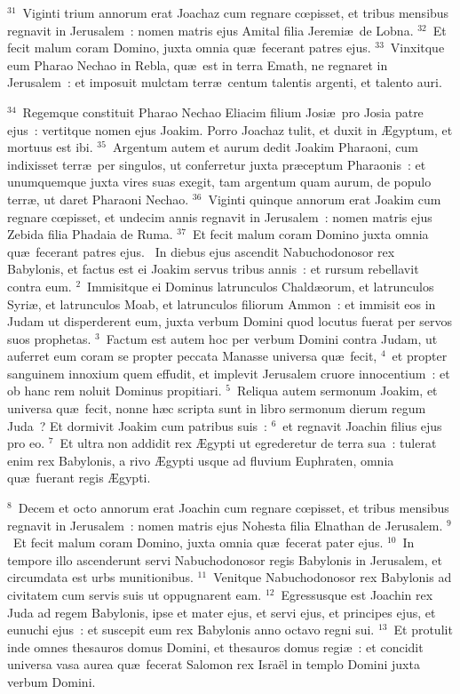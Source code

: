 ${}^{31}$~Viginti trium annorum erat Joachaz cum regnare cœpisset, et tribus mensibus regnavit in Jerusalem~: nomen matris ejus Amital filia Jeremi\ae\ de Lobna.
${}^{32}$~Et fecit malum coram Domino, juxta omnia qu\ae\ fecerant patres ejus.
${}^{33}$~Vinxitque eum Pharao Nechao in Rebla, qu\ae\ est in terra Emath, ne regnaret in Jerusalem~: et imposuit mulctam terr\ae\ centum talentis argenti, et talento auri.


${}^{34}$~Regemque constituit Pharao Nechao Eliacim filium Josi\ae\ pro Josia patre ejus~: vertitque nomen ejus Joakim. Porro Joachaz tulit, et duxit in \AE gyptum, et mortuus est ibi.
${}^{35}$~Argentum autem et aurum dedit Joakim Pharaoni, cum indixisset terr\ae\ per singulos, ut conferretur juxta pr\ae ceptum Pharaonis~: et unumquemque juxta vires suas exegit, tam argentum quam aurum, de populo terr\ae , ut daret Pharaoni Nechao.
${}^{36}$~Viginti quinque annorum erat Joakim cum regnare cœpisset, et undecim annis regnavit in Jerusalem~: nomen matris ejus Zebida filia Phadaia de Ruma.
${}^{37}$~Et fecit malum coram Domino juxta omnia qu\ae\ fecerant patres ejus.
~\lettrine[lines=10,image=true,loversize=0.05,lraise=-0.03]{I}{}n diebus ejus ascendit Nabuchodonosor rex Babylonis, et factus est ei Joakim servus tribus annis~: et rursum rebellavit contra eum.
${}^{2}$~Immisitque ei Dominus latrunculos Chald\ae orum, et latrunculos Syri\ae , et latrunculos Moab, et latrunculos filiorum Ammon~: et immisit eos in Judam ut disperderent eum, juxta verbum Domini quod locutus fuerat per servos suos prophetas.
${}^{3}$~Factum est autem hoc per verbum Domini contra Judam, ut auferret eum coram se propter peccata Manasse universa qu\ae\ fecit,
${}^{4}$~et propter sanguinem innoxium quem effudit, et implevit Jerusalem cruore innocentium~: et ob hanc rem noluit Dominus propitiari.
${}^{5}$~Reliqua autem sermonum Joakim, et universa qu\ae\ fecit, nonne h\ae c scripta sunt in libro sermonum dierum regum Juda~? Et dormivit Joakim cum patribus suis~:
${}^{6}$~et regnavit Joachin filius ejus pro eo.
${}^{7}$~Et ultra non addidit rex \AE gypti ut egrederetur de terra sua~: tulerat enim rex Babylonis, a rivo \AE gypti usque ad fluvium Euphraten, omnia qu\ae\ fuerant regis \AE gypti.


${}^{8}$~Decem et octo annorum erat Joachin cum regnare cœpisset, et tribus mensibus regnavit in Jerusalem~: nomen matris ejus Nohesta filia Elnathan de Jerusalem.
${}^{9}$~Et fecit malum coram Domino, juxta omnia qu\ae\ fecerat pater ejus.
${}^{10}$~In tempore illo ascenderunt servi Nabuchodonosor regis Babylonis in Jerusalem, et circumdata est urbs munitionibus.
${}^{11}$~Venitque Nabuchodonosor rex Babylonis ad civitatem cum servis suis ut oppugnarent eam.
${}^{12}$~Egressusque est Joachin rex Juda ad regem Babylonis, ipse et mater ejus, et servi ejus, et principes ejus, et eunuchi ejus~: et suscepit eum rex Babylonis anno octavo regni sui.
${}^{13}$~Et protulit inde omnes thesauros domus Domini, et thesauros domus regi\ae~: et concidit universa vasa aurea qu\ae\ fecerat Salomon rex Isra\"el in templo Domini juxta verbum Domini.


